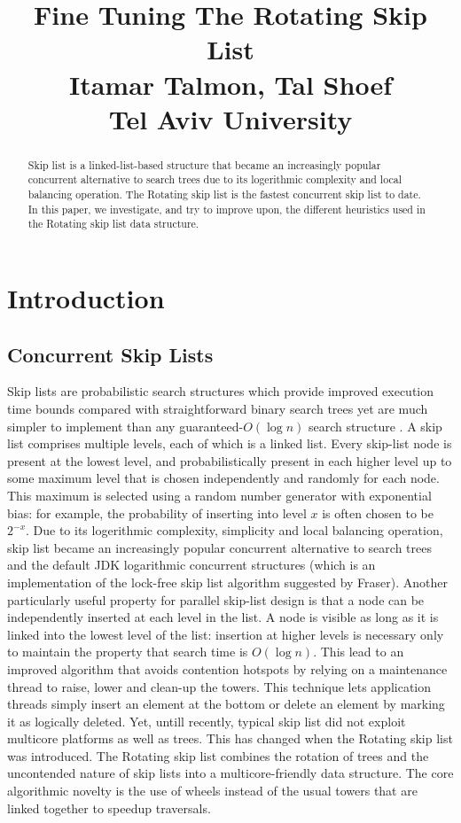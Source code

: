 \documentclass{article}
\title{Fine Tuning The Rotating Skip List\\Itamar Talmon, Tal Shoef\\
Tel Aviv University}
\begin{document}
%
\maketitle
%
\begin{abstract}
Skip list \cite{C3} is a linked-list-based structure that became an increasingly popular concurrent alternative to search trees due to its logerithmic complexity and local balancing operation. The Rotating skip list \cite{C1} is the fastest concurrent skip list to date. In this paper, we investigate, and try to improve upon, the different heuristics used in the Rotating skip list data structure.
\end{abstract}
%
\section{Introduction}
\label{sec:intro}

\subsection{Concurrent Skip Lists}
\label{ssec:csl}
Skip lists are probabilistic search structures which provide improved execution time bounds compared with straightforward binary search trees yet are much simpler to implement than any guaranteed-$O(\log{n})$ search structure \cite{C3}.
A skip list comprises multiple levels, each of which is a linked list. Every skip-list node is present at the lowest level, and probabilistically present in each higher level up to some maximum level that is chosen independently and randomly for each node. This maximum is selected using a random number generator with
exponential bias: for example, the probability of inserting into level $x$ is often chosen to be $2^{-x}$.
Due to its logerithmic complexity, simplicity and local balancing operation, skip list became an increasingly popular concurrent alternative to search trees and  the default JDK logarithmic concurrent structures (which is an implementation of the lock-free skip list algorithm suggested by Fraser\cite{C4}). Another particularly useful property for parallel skip-list design is that a node can be independently inserted at each level in the list. A node is visible as long as it is linked into the lowest level of the list: insertion at higher levels is necessary only to maintain the property that search time is $O(\log{n})$. This lead to an improved algorithm \cite{C2} that avoids contention hotspots by relying on a maintenance thread to raise, lower and clean-up the towers. This technique lets application threads simply insert an element at the bottom or delete an element by marking it as logically deleted. Yet, untill recently, typical skip list did not exploit multicore platforms as well as trees. This has changed when the Rotating skip list was introduced. The Rotating skip list \cite{C1} combines the rotation of trees and the uncontended nature of skip lists into a multicore-friendly data structure. The core algorithmic novelty is the use of wheels instead of the usual towers that are linked together to speedup traversals.
\end{document}
